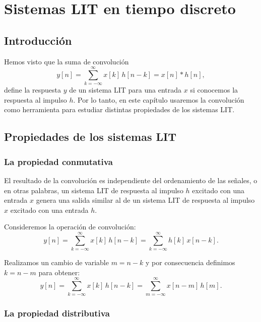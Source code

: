 \documentclass[11pt,a4paper,openany]{book}
\begin{document}
\chapter{Sistemas LIT en tiempo discreto}

\section{Introducción}

Hemos visto que la suma de convolución 
\begin{equation}
	y[n] = \sum_{k=-\infty}^{\infty} x[k] \, h[n-k] = x[n] * h[n] ,
\end{equation}
define la respuesta $y$ de un sistema LIT para una entrada $x$ si conocemos la respuesta al impulso $h$. Por lo tanto, en este capítulo usaremos la convolución como herramienta para estudiar distintas propiedades de los sistemas LIT.

\section{Propiedades de los sistemas LIT}

\subsection{La propiedad conmutativa}

El resultado de la convolución es independiente del ordenamiento de las señales, o en otras palabras, un sistema LIT de respuesta al impulso $h$ excitado con una entrada $x$ genera una salida similar al de un sistema LIT de respuesta al impulso $x$ excitado con una entrada $h$.

Consideremos la operación de convolución:
\begin{equation}
	y[n] = \sum_{k=-\infty}^{\infty} x[k] \, h[n-k] = \sum_{k=-\infty}^{\infty} h[k] \, x[n-k].
\end{equation}

Realizamos un cambio de variable $m = n - k$ y por consecuencia definimos $k = n - m$ para obtener:
\begin{equation}
	y[n] = \sum_{k=-\infty}^{\infty} x[k] \, h[n-k] = \sum_{m=-\infty}^{\infty} x[n-m] \, h[m].
\end{equation}

\subsection{La propiedad distributiva}
\end{document}
